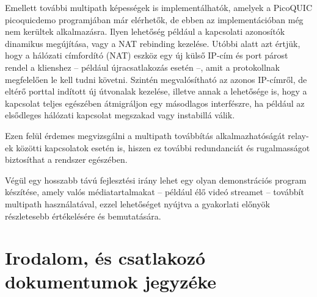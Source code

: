 \documentclass[a4paper,oneside]{article}
\begin{document}
Emellett további multipath képességek is implementálhatók, amelyek a PicoQUIC picoquicdemo 
programjában már elérhetők, de ebben az implementációban még nem kerültek alkalmazásra. Ilyen lehetőség 
például a kapcsolati azonosítók dinamikus megújítása, vagy a NAT rebinding kezelése. Utóbbi alatt 
azt értjük, hogy a hálózati címfordító (NAT) eszköz egy új külső IP-cím és port párost rendel a 
klienshez – például újracsatlakozás esetén –, amit a protokollnak megfelelően le kell tudni követni. 
Szintén megvalósítható az azonos IP-címről, de eltérő porttal indított új útvonalak kezelése, illetve 
annak a lehetősége is, hogy a kapcsolat teljes egészében átmigráljon egy másodlagos interfészre, ha 
például az elsődleges hálózati kapcsolat megszakad vagy instabillá válik. 

Ezen felül érdemes megvizsgálni a 
multipath továbbítás alkalmazhatóságát relay-ek közötti kapcsolatok esetén is, hiszen ez további 
redundanciát és rugalmasságot biztosíthat a rendszer egészében. 

Végül egy hosszabb távú fejlesztési 
irány lehet egy olyan demonstrációs program készítése, amely valós médiatartalmakat – például élő 
videó streamet – továbbít multipath használatával, ezzel lehetőséget nyújtva a gyakorlati előnyök 
részletesebb értékelésére és bemutatására.

\newpage
 
\section{Irodalom, és csatlakozó dokumentumok jegyzéke}
\label{sec:irod-es-csatl}
\end{document}
